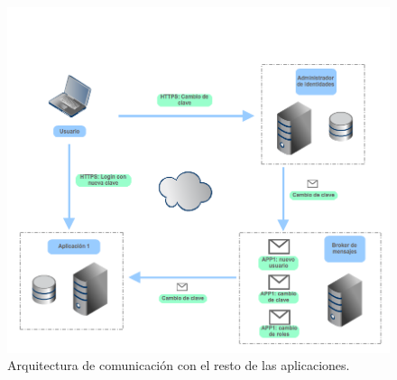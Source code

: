 \begin{figure}[!h]
\centering
\includegraphics[scale=0.4]{./contenido/img/arquitectura.png}
\caption{Arquitectura de comunicación con el resto de las aplicaciones.}
\end{figure}

